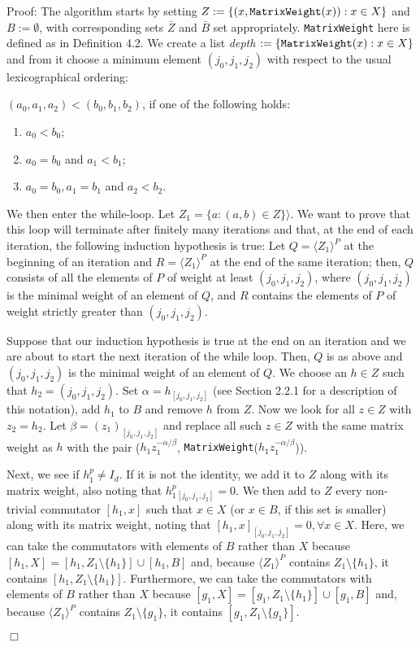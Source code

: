 \documentclass[12pt]{report}
\newenvironment{proof}{\normalsize {\sc Proof}:}{{\hfill $\Box$ \\}}
\begin{document}
\begin{proof}
The algorithm starts by setting $Z := \{(x, {\tt MatrixWeight}(x)) : x \in X\}$ and $B := \emptyset$, with corresponding sets $\bar{Z}$ and $\bar{B}$ set appropriately. {\tt MatrixWeight} here is defined as in Definition 4.2. We create a list \textit{depth} $:= \{{\tt MatrixWeight}(x) : x \in X\}$ and from it choose a minimum element $(j_0, j_1, j_2)$ with respect to the usual lexicographical ordering:

$(a_0, a_1, a_2) < (b_0, b_1, b_2)$, if one of the following holds:

\begin{enumerate}
\item $a_0 < b_0$;
\item $a_0 = b_0$ and $a_1 < b_1$; 
\item $a_0 = b_0, a_1 = b_1$ and $a_2 < b_2$.
\end{enumerate}

We then enter the while-loop. Let $Z_1 = \{a : (a, b) \in Z \} \rangle$.  We want to prove that this loop will terminate after finitely many iterations and that, at the end of each iteration, the following induction hypothesis is true: Let $Q = \langle Z_1 \rangle ^P$ at the beginning of an iteration and $R = \langle Z_1 \rangle ^P$ at the end of the same iteration; then, $Q$ consists of all the elements of $P$ of weight at least $(j_0, j_1, j_2)$, where $(j_0, j_1, j_2)$ is the minimal weight of an element of $Q$, and $R$ contains the elements of $P$ of weight strictly greater than $(j_0, j_1, j_2)$.

Suppose that our induction hypothesis is true at the end on an iteration and we are about to start the next iteration of the while loop. Then, $Q$ is as above and $(j_0, j_1, j_2)$ is the minimal weight of an element of $Q$. We choose an $h \in Z$ such that $h_2 = (j_0, j_1, j_2)$. Set $\alpha = h_{[j_0, j_1, j_2]}$ (see Section 2.2.1 for a description of this notation), add $h_1$ to $B$ and remove $h$ from $Z$. Now we look for all $z \in Z$ with $z_2 = h_2$. Let $\beta = (z_1)_{[j_0, j_1, j_2]}$ and replace all such $z \in Z$ with the same matrix weight as $h$ with the pair ($h_1 z_1^{-\alpha / \beta}$, {\tt MatrixWeight}($h_1 z_1^{-\alpha / \beta}$)).

Next, we see if $h_1^p \ne I_d$. If it is not the identity, we add it to $Z$ along with its matrix weight, also noting that $h_1^p _{[j_0, j_1, j_2]} = 0$. We then add to $Z$ every non-trivial commutator $[h_1, x]$ such that $x \in X$ (or $x \in B$, if this set is smaller) along with its matrix weight, noting that $[h_1, x] _{[j_0, j_1, j_2]} = 0, \forall x \in X$. Here, we can take the commutators with elements of $B$ rather than $X$ because $[h_1 ,X] = [h_1, Z_1 \setminus \{h_1\}] \cup [h_1, B]$ and, because $\langle Z_1 \rangle ^P$ contains $Z_1 \setminus \{h_1\}$, it contains $[h_1, Z_1 \setminus \{h_1\}]$. Furthermore, we can take the commutators with elements of $B$ rather than $X$ because $[g_1 ,X] = [g_1, Z_1 \setminus \{h_1\}] \cup [g_1, B]$ and, because $\langle Z_1 \rangle ^P$ contains $Z_1 \setminus \{g_1\}$, it contains $[g_1, Z_1 \setminus \{g_1\}]$.


\end{proof}
\end{document}
